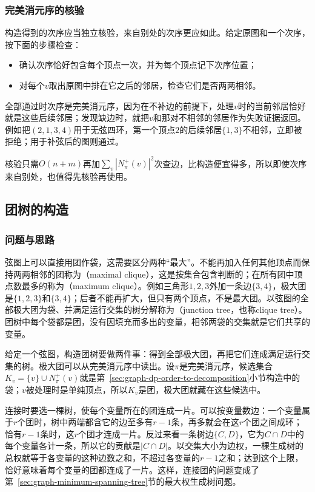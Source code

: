 \subsubsection{完美消元序的核验}

构造得到的次序应当独立核验，来自别处的次序更应如此。给定原图和一个次序，按下面的步骤检查：
\begin{itemize}
  \item 确认次序恰好包含每个顶点一次，并为每个顶点记下次序位置；
  \item 对每个$v$取出原图中排在它之后的邻居，检查它们是否两两相邻。
\end{itemize}
全部通过时次序是完美消元序，因为在不补边的前提下，处理$v$时的当前邻居恰好就是这些后续邻居；发现缺边时，就把$v$和那对不相邻的邻居作为失败证据返回。例如把$(2,1,3,4)$用于无弦四环，第一个顶点$2$的后续邻居$\{1,3\}$不相邻，立即被拒绝；用于补弦后的图则通过。

核验只需$O(n+m)$再加$\sum_v|N^+_\pi(v)|^2$次查边，比构造便宜得多，所以即使次序来自别处，也值得先核验再使用。

\subsection{团树的构造}
\label{sec:graph-dp-clique-tree}

\subsubsection{问题与思路}

弦图上可以直接用团作袋，这需要区分两种“最大”。不能再加入任何其他顶点而保持两两相邻的团称为（maximal clique），这是按集合包含判断的；在所有团中顶点数最多的称为（maximum clique）。例如三角形$1,2,3$外加一条边$\{3,4\}$，极大团是$\{1,2,3\}$和$\{3,4\}$；后者不能再扩大，但只有两个顶点，不是最大团。以弦图的全部极大团为袋、并满足运行交集的树分解称为（junction tree，也称clique tree）。团树中每个袋都是团，没有因填充而多出的变量，相邻两袋的交集就是它们共享的变量。

给定一个弦图，构造团树要做两件事：得到全部极大团，再把它们连成满足运行交集的树。极大团可以从完美消元序中读出。设$\pi$是完美消元序，候选集合$K_v=\{v\}\cup N^+_\pi(v)$就是第~\ref{sec:graph-dp-order-to-decomposition}小节构造中的袋；$v$被处理时是单纯顶点，所以$K_v$是团，极大团就藏在这些候选中。

连接时要选一棵树，使每个变量所在的团连成一片。可以按变量数边：一个变量属于$r$个团时，树中两端都含它的边至多有$r-1$条，再多就会在这$r$个团之间成环；恰有$r-1$条时，这$r$个团才连成一片。反过来看一条树边$\{C,D\}$，它为$C\cap D$中的每个变量各计一条，所以它的贡献是$|C\cap D|$。以交集大小为边权，一棵生成树的总权就等于各变量的这种边数之和，不超过各变量的$r-1$之和；达到这个上限，恰好意味着每个变量的团都连成了一片。这样，连接团的问题变成了第~\ref{sec:graph-minimum-spanning-tree}节的最大权生成树问题。

